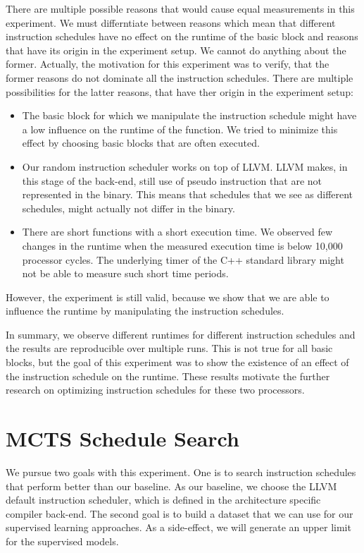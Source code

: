 
There are multiple possible reasons that would cause equal measurements in this experiment.
We must differntiate between reasons which mean that different instruction schedules have no effect on the runtime of the basic block and reasons that have its origin in the experiment setup.
We cannot do anything about the former.
Actually, the motivation for this experiment was to verify, that the former reasons do not dominate all the instruction schedules.
There are multiple possibilities for the latter reasons, that have ther origin in the experiment setup:
\begin{itemize}
    \item The basic block for which we manipulate the instruction schedule might have a low influence on the runtime of the function.
        We tried to minimize this effect by choosing basic blocks that are often executed.
    \item Our random instruction scheduler works on top of LLVM.
        LLVM makes, in this stage of the back-end, still use of pseudo instruction that are not represented in the binary.
        This means that schedules that we see as different schedules, might actually not differ in the binary.
    \item There are short functions with a short execution time.
        We observed few changes in the runtime when the measured execution time is below 10,000 processor cycles.
        The underlying timer of the C++ standard library might not be able to measure such short time periods.  
\end{itemize}
However, the experiment is still valid, because we show that we are able to influence the runtime by manipulating the instruction schedules.

In summary, we observe different runtimes for different instruction schedules and the results are reproducible over multiple runs.
This is not true for all basic blocks, but the goal of this experiment was to show the existence of an effect of the instruction schedule on the runtime.
These results motivate the further research on optimizing instruction schedules for these two processors.

\section{MCTS Schedule Search}
\label{sec:eval:mcts}
We pursue two goals with this experiment.
One is to search instruction schedules that perform better than our baseline.
As our baseline, we choose the LLVM default instruction scheduler, which is defined in the architecture specific compiler back-end.
The second goal is to build a dataset that we can use for our supervised learning approaches.
As a side-effect, we will generate an upper limit for the supervised models.


